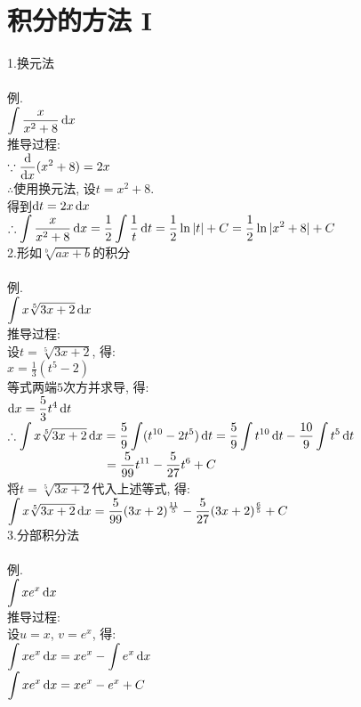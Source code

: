\chapter{积分的方法 I}
1.换元法\\[1ex]
\\[1ex]
例.\\[1ex]
$\displaystyle\int\frac{x}{x^2+8}\mathop{}\!\mathrm{d} x$\\[1ex]
推导过程:\\[1ex]
$\displaystyle\because\frac{\mathop{}\!\mathrm{d}}{\mathop{}\!\mathrm{d} x}(x^2+8)=2x$\\[1ex]
$\therefore$使用换元法, 设$t=x^2+8$.\\[1ex]
\phantom{$\therefore$}得到$\mathop{}\!\mathrm{d} t=2x\mathop{}\!\mathrm{d} x$\\[1ex]
$\therefore\displaystyle\int\frac{x}{x^2+8}\mathop{}\!\mathrm{d} x=\frac{1}{2}\int\frac{1}{t}\mathop{}\!\mathrm{d} t=\frac{1}{2}\ln|t|+C=\frac{1}{2}\ln|x^2+8|+C$\\[2ex]

2.形如$\sqrt[b]{ax+b}$的积分\\[1ex]
\\[1ex]
例.\\[1ex]
$\displaystyle\int x\sqrt[5]{3x+2}\mathop{}\!\mathrm{d} x$\\[1ex]
推导过程:\\[1ex]
设$t=\sqrt[5]{3x+2}$, 得:\\[1ex]
$\displaystyle x=\frac{1}{3}(t^5-2)$\\[1ex]
等式两端$5$次方并求导, 得:\\[1ex]
$\displaystyle\mathop{}\!\mathrm{d} x=\frac{5}{3}t^4\mathop{}\!\mathrm{d} t$\\[1ex]
$\displaystyle\therefore\int x\sqrt[5]{3x+2}\mathop{}\!\mathrm{d} x=\frac{5}{9}\int(t^{10}-2t^5)\mathop{}\!\mathrm{d} t=\frac{5}{9}\int t^{10}\mathop{}\!\mathrm{d} t-\frac{10}{9}\int t^5\mathop{}\!\mathrm{d} t$\\[1ex]
$\displaystyle\phantom{\therefore\int x\sqrt[5]{3x+2}\dif x}=\frac{5}{99}t^{11}-\frac{5}{27}t^6+C$\\[1ex]
将$t=\sqrt[5]{3x+2}$代入上述等式, 得:\\[1ex]
$\displaystyle\int x\sqrt[5]{3x+2}\mathop{}\!\mathrm{d} x=\frac{5}{99}(3x+2)^{\frac{11}{5}}-\frac{5}{27}(3x+2)^{\frac{6}{5}}+C$\\[2ex]

3.分部积分法\\[1ex]
\\[1ex]
例.\\[1ex]
$\displaystyle\int xe^x\mathop{}\!\mathrm{d} x$\\[1ex]
推导过程:\\[1ex]
设$u=x$, $v=e^x$, 得:\\[1ex]
$\displaystyle\int xe^x\mathop{}\!\mathrm{d} x=xe^x-\int e^x\mathop{}\!\mathrm{d} x$\\[1ex]
$\displaystyle\int xe^x\mathop{}\!\mathrm{d} x=xe^x-e^x+C$\\[2ex]

